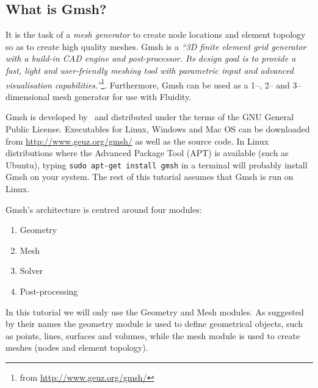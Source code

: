 \subsection{What is Gmsh?}
\label{sect:Gmsh}
\par
It is the task of a \emph{mesh generator} to create node locations and element topology so as to create high quality meshes. Gmsh is a \emph{``3D finite element grid generator with a build-in CAD engine and post-processor. Its design goal is to provide a fast, light and user-friendly meshing tool with parametric input and advanced visualisation capabilities.''}\footnote{from \url{http://www.geuz.org/gmsh/}}. Furthermore, Gmsh can be used as a 1--, 2-- and 3-- dimensional mesh generator for use with Fluidity.
\par
Gmsh is developed by~\cite{Geuzaine_Remacle_2009} and distributed under the terms of the GNU General Public License. Executables for Linux, Windows and Mac OS can be downloaded from \url{http://www.geuz.org/gmsh/} as well as the source code. In Linux distributions where the Advanced Package Tool (APT) is available (such as Ubuntu), typing \lstinline{sudo apt-get install gmsh} in a terminal will probably install Gmsh on your system. The rest of this tutorial assumes that Gmsh is run on Linux. 
\par
Gmsh's architecture is centred around four modules:
\begin{enumerate}
  \item Geometry
  \item Mesh
  \item Solver
  \item Post-processing
\end{enumerate}
In this tutorial we will only use the Geometry and Mesh modules. As suggested by their names the geometry
module is used to define geometrical objects, such as points, lines, surfaces and volumes, while the
mesh module is used to create meshes (nodes and element topology).

